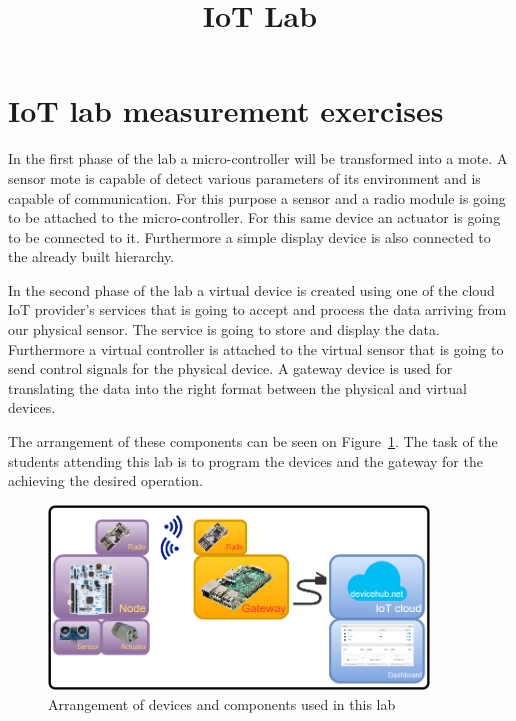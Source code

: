 \documentclass[a4paper]{article}
\title{IoT Lab}
\author{}
\date{}
\begin{document}
\maketitle

\tableofcontents

\section{IoT lab measurement exercises}

In the first phase of the lab a micro-controller will be transformed into a mote. A sensor mote is capable of detect various parameters of its environment and is capable of communication. For this purpose a sensor and a radio module is going to be attached to the micro-controller. For this same device an actuator is going to be connected to it. Furthermore a simple display device is also connected to the already built hierarchy.

In the second phase of the lab a virtual device is created using one of the cloud IoT provider's services that is going to accept and process the data arriving from our physical sensor. The service is going to store and display the data. Furthermore a virtual controller is attached to the virtual sensor that is going to send control signals for the physical device. A gateway device is used for translating the data into the right format between the physical and virtual devices.

The arrangement of these components can be seen on Figure~\ref{fig:meas-arrangement}. The task of the students attending this lab is to program the devices and the gateway for the achieving the desired operation.

\begin{figure}[H]
    \centering
    \includegraphics[width=0.9\textwidth]{figures/devices-arrangement.png}
    \caption{Arrangement of devices and components used in this lab}
    \label{fig:meas-arrangement}
\end{figure}
\end{document}
